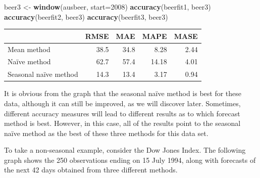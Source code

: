 \documentclass[]{book}
\newenvironment{Shaded}{\begin{snugshade}}{\end{snugshade}}
\newcommand{\DataTypeTok}[1]{\textcolor[rgb]{0.13,0.29,0.53}{#1}}
\newcommand{\DecValTok}[1]{\textcolor[rgb]{0.00,0.00,0.81}{#1}}
\newcommand{\KeywordTok}[1]{\textcolor[rgb]{0.13,0.29,0.53}{\textbf{#1}}}
\newcommand{\NormalTok}[1]{#1}
\newcommand{\StringTok}[1]{\textcolor[rgb]{0.31,0.60,0.02}{#1}}
\begin{document}
\begin{Shaded}
\begin{Highlighting}[]
\NormalTok{beer3 <-}\StringTok{ }\KeywordTok{window}\NormalTok{(ausbeer, }\DataTypeTok{start=}\DecValTok{2008}\NormalTok{)}
\KeywordTok{accuracy}\NormalTok{(beerfit1, beer3)}
\KeywordTok{accuracy}\NormalTok{(beerfit2, beer3)}
\KeywordTok{accuracy}\NormalTok{(beerfit3, beer3)}
\end{Highlighting}
\end{Shaded}

\begin{tabular}{lrrrr}
\toprule
  & RMSE & MAE & MAPE & MASE\\
\midrule
Mean method & 38.5 & 34.8 & 8.28 & 2.44\\
Naïve method & 62.7 & 57.4 & 14.18 & 4.01\\
Seasonal naïve method & 14.3 & 13.4 & 3.17 & 0.94\\
\bottomrule
\end{tabular}

It is obvious from the graph that the seasonal naïve method is best for these data, although it can still be improved, as we will discover later. Sometimes, different accuracy measures will lead to different results as to which forecast method is best. However, in this case, all of the results point to the seasonal naïve method as the best of these three methods for this data set.

To take a non-seasonal example, consider the Dow Jones Index. The following graph shows the 250 observations ending on 15 July 1994, along with forecasts of the next 42 days obtained from three different methods.
\end{document}
